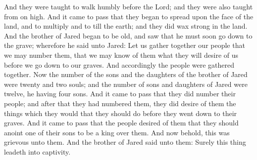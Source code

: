 \bverse \iffalse And they were taught to walk humbly before the Lord; and they were also taught from on high. \fi
And they were taught to walk humbly before the Lord; and they were also taught from on high.
\bverse \iffalse And it came to pass that they began to spread upon the face of the land, and to multiply and to till the earth; and they did wax strong in the land. \fi
And it came to pass that they began to spread upon the face of the land, and to multiply and to till the earth; and they did wax strong in the land.
\bverse \iffalse And the brother of Jared began to be old, and saw that he must soon go down to the grave; wherefore he said unto Jared: Let us gather together our people that we may number them, that we may know of them what they will desire of us before we go down to our graves. \fi
And the brother of Jared began to be old, and saw that he must soon go down to the grave; wherefore he said unto Jared: Let us gather together our people that we may number them, that we may know of them what they will desire of us before we go down to our graves.
\bverse \iffalse And accordingly the people were gathered together. Now the number of the sons and the daughters of the brother of Jared were twenty and two souls; and the number of sons and daughters of Jared were twelve, he having four sons. \fi
And accordingly the people were gathered together. Now the number of the sons and the daughters of the brother of Jared were twenty and two souls; and the number of sons and daughters of Jared were twelve, he having four sons.
\bverse \iffalse And it came to pass that they did number their people; and after that they had numbered them, they did desire of them the things which they would that they should do before they went down to their graves. \fi
And it came to pass that they did number their people; and after that they had numbered them, they did desire of them the things which they would that they should do before they went down to their graves.
\bverse \iffalse And it came to pass that the people desired of them that they should anoint one of their sons to be a king over them. \fi
And it came to pass that the people desired of them that they should anoint one of their sons to be a king over them.
\bverse \iffalse And now behold, this was grievous unto them. And the brother of Jared said unto them: Surely this thing leadeth into captivity. \fi
And now behold, this was grievous unto them. And the brother of Jared said unto them: Surely this thing leadeth into captivity.
